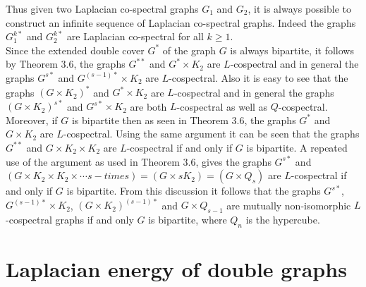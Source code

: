 \documentclass[12pt,a4paper]{amsart}
\theoremstyle{theorem}
\theoremstyle{definition}
\numberwithin{equation}{section} \makeatletter
\begin{document}
\indent Thus given two Laplacian co-spectral graphs $G_1$ and $G_2$, it is always possible to construct an infinite sequence of Laplacian co-spectral graphs. Indeed the graphs $G_1^{k*}$ and $G_2^{k*}$ are Laplacian co-spectral for all $k\geq 1$.\\
\indent Since the extended double cover $G^*$ of the graph $G$ is always bipartite, it follows by Theorem 3.6, the graphs $G^{**}$ and $G^*\times K_2$ are $L$-cospectral and in general the graphs $G^{s*}$ and $G^{(s-1)*}\times K_2$ are $L$-cospectral. Also it is easy to see that the graphs $(G\times K_2)^*$ and $G^*\times K_2$ are $L$-cospectral and in general the graphs $(G\times K_2)^{s*}$ and $G^{s*}\times K_2$ are both $L$-cospectral as well as $Q$-cospectral. Moreover, if $G$ is bipartite then as seen in Theorem 3.6, the graphs $G^*$ and $G\times K_2$ are $L$-cospectral. Using the same argument it can be seen that the graphs $G^{**}$ and $G\times K_2\times K_2$ are $L$-cospectral if and only if $G$ is bipartite. A repeated use of the argument as used in Theorem 3.6, gives the graphs $G^{s*}$ and $(G\times K_2\times K_2\times\cdots s-times)=(G\times sK_2)=(G\times Q_s)$ are $L$-cospectral if and only if $G$ is bipartite. From this discussion it follows that the graphs $G^{s*}$, $G^{(s-1)*}\times K_2$, $(G\times K_2)^{(s-1)*}$ and $G\times Q_{s-1}$ are mutually non-isomorphic $L$-cospectral graphs if and only $G$ is bipartite, where $Q_n$ is the hypercube.

\section{Laplacian energy of double graphs}
\end{document}
